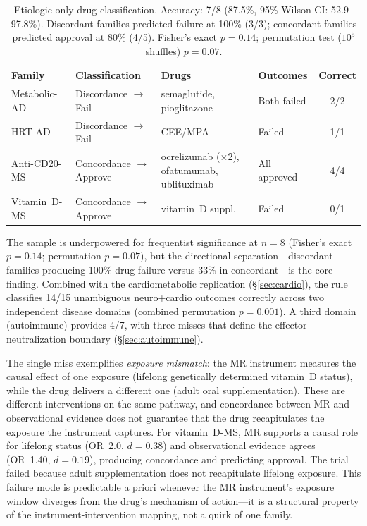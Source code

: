 \documentclass[11pt]{article}
\begin{document}
\begin{table}[t]
\centering
\caption{Etiologic-only drug classification. Accuracy: 7/8 (87.5\%, 95\% Wilson CI: 52.9--97.8\%). Discordant families predicted failure at 100\% (3/3); concordant families predicted approval at 80\% (4/5). Fisher's exact $p = 0.14$; permutation test ($10^5$ shuffles) $p = 0.07$.}
\label{tab:drugs_stage1}
\begin{tabular}{llllc}
\toprule
Family & Classification & Drugs & Outcomes & Correct \\
\midrule
Metabolic-AD & Discordance $\to$ Fail & semaglutide, pioglitazone & Both failed & 2/2 \\
HRT-AD & Discordance $\to$ Fail & CEE/MPA & Failed & 1/1 \\
Anti-CD20-MS & Concordance $\to$ Approve & \parbox[t]{3.2cm}{ocrelizumab ($\times$2),\\ofatumumab,\\ublituximab} & All approved & 4/4 \\
Vitamin~D-MS & Concordance $\to$ Approve & vitamin~D suppl. & Failed & 0/1 \\
\bottomrule
\end{tabular}
\end{table}

The sample is underpowered for frequentist significance at $n = 8$ (Fisher's exact $p = 0.14$; permutation $p = 0.07$), but the directional separation---discordant families producing 100\% drug failure versus 33\% in concordant---is the core finding. Combined with the cardiometabolic replication (\S\ref{sec:cardio}), the rule classifies 14/15 unambiguous neuro+cardio outcomes correctly across two independent disease domains (combined permutation $p = 0.001$). A third domain (autoimmune) provides 4/7, with three misses that define the effector-neutralization boundary (\S\ref{sec:autoimmune}).

The single miss exemplifies \emph{exposure mismatch}: the MR instrument measures the causal effect of one exposure (lifelong genetically determined vitamin~D status), while the drug delivers a different one (adult oral supplementation). These are different interventions on the same pathway, and concordance between MR and observational evidence does not guarantee that the drug recapitulates the exposure the instrument captures. For vitamin~D-MS, MR supports a causal role for lifelong status (OR~2.0, $d = 0.38$) and observational evidence agrees (OR~1.40, $d = 0.19$), producing concordance and predicting approval. The trial failed because adult supplementation does not recapitulate lifelong exposure. This failure mode is predictable a priori whenever the MR instrument's exposure window diverges from the drug's mechanism of action---it is a structural property of the instrument-intervention mapping, not a quirk of one family.
\end{document}
